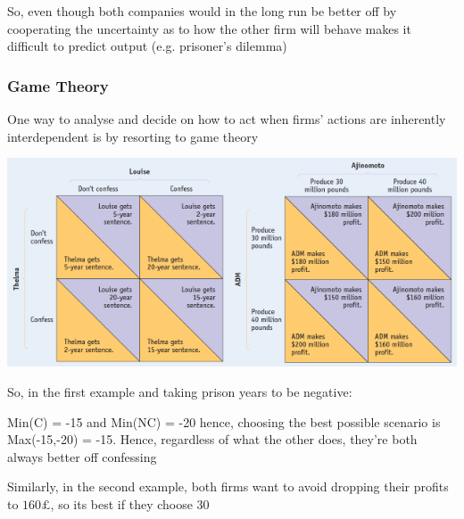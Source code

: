\documentclass[english,course,draft]{Notes}
\begin{document}
\par{So, even though both companies would in the long run be better off by cooperating the uncertainty as to how the other firm will behave makes it difficult to predict output (e.g. prisoner's dilemma) }

\subsubsection{Game Theory}

\par{One way to analyse and decide on how to act when firms' actions are inherently interdependent is by resorting to game theory }




\includegraphics[width=0.5\textwidth]{g}\includegraphics[width=0.5\textwidth]{g2}

\par{So, in the first example and taking prison years to be negative:}
\par{Min(C) = -15 and Min(NC) = -20 hence, choosing the best possible scenario is Max(-15,-20) = -15. Hence, regardless of what the other does, they're both always better off confessing}
\par{Similarly, in the second example, both firms want to avoid dropping their profits to $160\pounds$, so its best if they choose $30$} 
\end{document}
